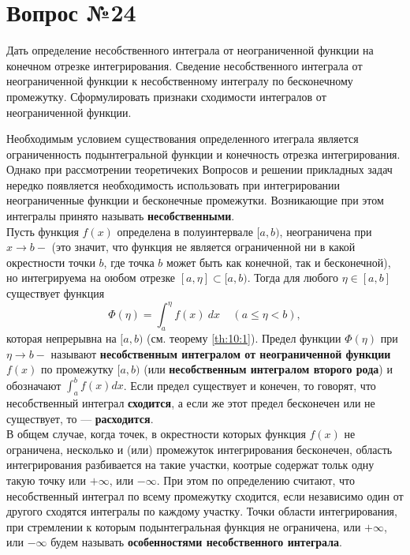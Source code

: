 \documentclass[12pt]{report}
\numberwithin{equation}{section}
\begin{document}
\newpage \section{Вопрос №24} %
\begin{framed}
Дать определение несобственного интеграла от неограниченной функции на конечном отрезке интегрирования. Сведение несобственного интеграла от неограниченной функции к несобственному интегралу по бесконечному промежутку. Сформулировать  признаки сходимости интегралов от неограниченной функции.
\end{framed}

Необходимым условием существования определенного итеграла является ограниченность подынтегральной функции и конечность отрезка интегрирования. Однако при рассмотрении теоретичеких Вопросов и решении прикладных задач нередко появляется необходимость использовать при интегрировании неограниченные функции и бесконечные промежутки. Возникающие при этом интегралы принято называть \textbf{несобственными}.\\

Пусть функция $f(x)$ определена в полуинтервале $[a,b)$, неограничена при $x \to b-$ (это значит, что функция не является ограниченной ни в какой окрестности точки $b$, где точка $b$ может быть как конечной, так и бесконечной), но интегрируема на оюбом отрезке $[a,\eta] \subset [a,b)$. Тогда для любого $\eta \in [a,b]$ существует функция 
\[ \Phi(\eta) = \int_a^{\eta} f(x)~dx ~~~~~ (a \leqslant \eta < b),\]
которая непрерывна на $[a,b)$ (см. теорему \ref{th:10:1}). Предел функции $\Phi(\eta)$ при $\eta \to b-$ называют \textbf{несобственным интегралом от неограниченной функции} $f(x)$ по промежутку $[a,b)$ (или \textbf{несобственным интегралом второго рода}) и обозначают $\int_a^b f(x)dx$. Если предел существует и конечен, то говорят, что несобственный интеграл \textbf{сходится}, а если же этот предел бесконечен или не существует, то --- \textbf{расходится}.\\

В общем случае, когда точек, в окрестности которых функция $f(x)$ не ограничена, несколько и (или) промежуток интегрирования бесконечен, область интегрирования разбивается на такие участки, коотрые содержат тольк одну такую точку или $+\infty$, или $-\infty$. При этом по определению считают, что несобственный интеграл по всему промежутку сходится, если независимо один от другого сходятся интегралы по каждому участку. Точки области интегрирования, при стремлении к которым подынтегральная функция не ограничена, или $+\infty$, или $-\infty$ будем называть \textbf{особенностями несобственного интеграла}.\\
\end{document}
